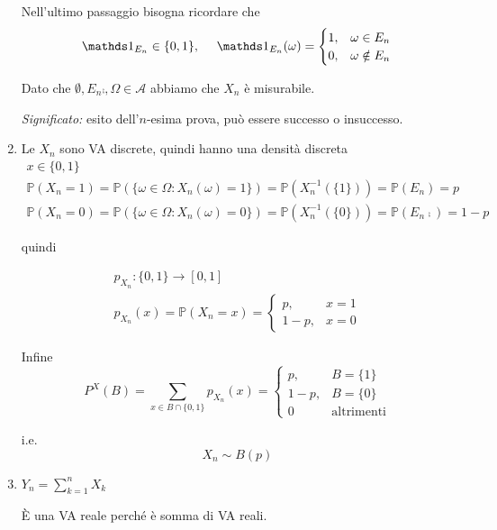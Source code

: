 \begin{enumerate}
Nell'ultimo passaggio bisogna ricordare che\begin{equation*}
\Ind_{E_{n}} \in \{0,1\} ,\ \ \ \ \Ind_{E_{n}}( \omega ) =\begin{cases}
1, & \omega \in E_{n}\\
0, & \omega \notin E_{n}
\end{cases}
\end{equation*}

Dato che $\emptyset ,E_{n}\comp ,\Omega \in \mathcal{A}$ abbiamo che $X_{n}$ è misurabile.

\textit{Significato:} esito dell'$n$-esima prova, può essere successo o insuccesso.
\item Le $X_{n}$ sono VA discrete, quindi hanno una densità discreta\begin{gather*}
x\in \{0,1\}\\
\mathbb{P}( X_{n} =1) =\mathbb{P}(\{\omega \in \Omega :X_{n}( \omega ) =1\}) =\mathbb{P}\left( X_{n}^{-1}(\{1\})\right) =\mathbb{P}( E_{n}) =p\\
\mathbb{P}( X_{n} =0) =\mathbb{P}(\{\omega \in \Omega :X_{n}( \omega ) =0\}) =\mathbb{P}\left( X_{n}^{-1}(\{0\})\right) =\mathbb{P}\left( E_{n}\comp\right) =1-p
\end{gather*}

quindi

\begin{gather*}
p_{X_{n}} :\{0,1\}\rightarrow [ 0,1]\\
p_{X_{n}}( x) =\mathbb{P}( X_{n} =x) =\begin{cases}
p, & x=1\\
1-p, & x=0
\end{cases}
\end{gather*}

Infine\begin{equation*}
P^{X}( B) =\sum\limits _{x\in B\cap \{0,1\}} p_{X_{n}}( x) =\begin{cases}
p, & B=\{1\}\\
1-p, & B=\{0\}\\
0 & \text{altrimenti}
\end{cases}
\end{equation*}

i.e.\begin{equation*}
\boxed{X_{n} \sim B( p)}
\end{equation*}
\item $Y_{n} =\sum\limits _{k=1}^{n} X_{k}$

È una VA reale perché è somma di VA reali.


\end{enumerate}
